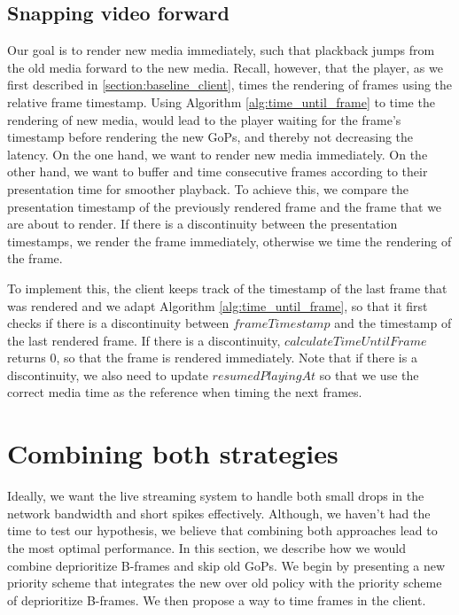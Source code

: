 \subsection{Snapping video forward}\label{section:snapping_video_forward}
Our goal is to render new media immediately, such that plackback jumps from the old media forward to the new media. Recall, however, that the player, as we first described in \autoref{section:baseline_client}, times the rendering of frames using the relative frame timestamp. Using Algorithm \ref{alg:time_until_frame} to time the rendering of new media, would lead to the player waiting for the frame's timestamp before rendering the new GoPs, and thereby not decreasing the latency. On the one hand, we want to render new media immediately. On the other hand, we want to buffer and time consecutive frames according to their presentation time for smoother playback. To achieve this, we compare the presentation timestamp of the previously rendered frame and the frame that we are about to render. If there is a discontinuity between the presentation timestamps, we render the frame immediately, otherwise we time the rendering of the frame.

To implement this, the client keeps track of the timestamp of the last frame that was rendered and we adapt Algorithm \ref{alg:time_until_frame}, so that it first checks if there is a discontinuity between $frameTimestamp$ and the timestamp of the last rendered frame. If there is a discontinuity, $calculateTimeUntilFrame$ returns 0, so that the frame is rendered immediately. Note that if there is a discontinuity, we also need to update $resumedPlayingAt$ so that we use the correct media time as the reference when timing the next frames.

\section{Combining both strategies}
Ideally, we want the live streaming system to handle both small drops in the network bandwidth and short spikes effectively. Although, we haven't had the time to test our hypothesis, we believe that combining both approaches lead to the most optimal performance. In this section, we describe how we would combine deprioritize B-frames and skip old GoPs. We begin by presenting a new priority scheme that integrates the new over old policy with the priority scheme of deprioritize B-frames. We then propose a way to time frames in the client.

